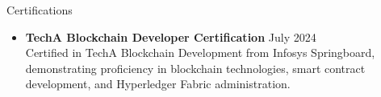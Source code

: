 \documentclass{resume} %
\begin{document}
 
\begin{rSection}{Certifications}
    \begin{itemize}


        \item \textbf{TechA Blockchain Developer Certification} \hfill July 2024\\
              Certified in TechA Blockchain Development from Infosys Springboard, demonstrating proficiency in blockchain technologies, smart contract development, and Hyperledger Fabric administration.






\end{itemize}
\end{rSection}
\end{document}
